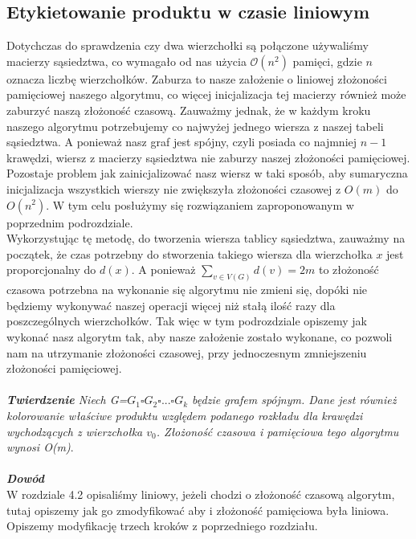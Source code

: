 \documentclass[12pt,a4paper,titlepage]{article}
\begin{document}
\subsection{Etykietowanie produktu w czasie liniowym}
Dotychczas do sprawdzenia czy dwa wierzchołki są połączone używaliśmy macierzy sąsiedztwa, co wymagało od nas użycia $\mathcal{O}(n^2)$ pamięci, gdzie $n$ oznacza liczbę wierzchołków. Zaburza to nasze założenie o liniowej złożoności pamięciowej naszego algorytmu, co więcej inicjalizacja tej macierzy również może zaburzyć naszą złożoność czasową. Zauważmy jednak, że w każdym kroku naszego algorytmu potrzebujemy co najwyżej jednego wiersza z naszej tabeli sąsiedztwa. A ponieważ nasz graf jest spójny, czyli posiada co najmniej $n-1$ krawędzi, wiersz z macierzy sąsiedztwa nie zaburzy naszej złożoności pamięciowej. Pozostaje problem jak zainicjalizować nasz wiersz w taki sposób, aby sumaryczna inicjalizacja wszystkich wierszy nie zwiększyła złożoności czasowej z $O(m)$ do $O(n^2)$. W tym celu posłużymy się rozwiązaniem zaproponowanym w poprzednim podrozdziale.\\
Wykorzystując tę metodę, do tworzenia wiersza tablicy sąsiedztwa, zauważmy na początek, że czas potrzebny do stworzenia takiego wiersza dla wierzchołka $x$ jest proporcjonalny do $d(x)$. A ponieważ $\sum_{v \in V(G)}d(v) = 2m$ to złożoność czasowa potrzebna na wykonanie się algorytmu nie zmieni się, dopóki nie będziemy wykonywać naszej operacji więcej niż stałą ilość razy dla poszczególnych wierzchołków. Tak więc w tym podrozdziale opiszemy jak wykonać nasz algorytm tak, aby nasze założenie zostało wykonane, co pozwoli nam na utrzymanie złożoności czasowej, przy jednoczesnym zmniejszeniu złożoności pamięciowej.\\
\\
\textit{\textbf{Twierdzenie} Niech G=$G_1 \square G_2 \square ... \square G_k$ będzie grafem spójnym. Dane jest również kolorowanie właściwe produktu względem podanego rozkładu dla krawędzi wychodzących z wierzchołka $v_0$. Złożoność czasowa i pamięciowa tego algorytmu wynosi O(m)}.\\
\\
\textit{\textbf{Dowód}}\\ 
W rozdziale 4.2 opisaliśmy liniowy, jeżeli chodzi o złożoność czasową algorytm, tutaj opiszemy jak go zmodyfikować aby i złożoność pamięciowa była liniowa. Opiszemy modyfikację trzech kroków z poprzedniego rozdziału.\\
\end{document}
